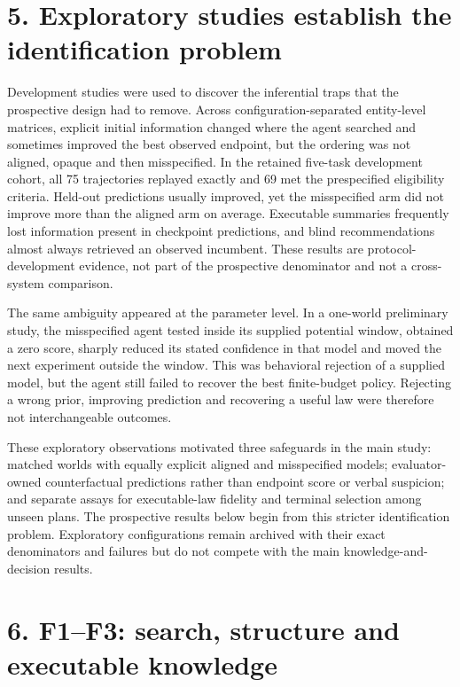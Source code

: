\documentclass[10pt,twocolumn]{article}
\begin{document}
\section{5. Exploratory studies establish the identification
problem}\label{exploratory-studies-establish-the-identification-problem}

Development studies were used to discover the inferential traps that the
prospective design had to remove. Across configuration-separated
entity-level matrices, explicit initial information changed where the
agent searched and sometimes improved the best observed endpoint, but
the ordering was not aligned, opaque and then misspecified. In the
retained five-task development cohort, all 75 trajectories replayed
exactly and 69 met the prespecified eligibility criteria. Held-out
predictions usually improved, yet the misspecified arm did not improve
more than the aligned arm on average. Executable summaries frequently
lost information present in checkpoint predictions, and blind
recommendations almost always retrieved an observed incumbent. These
results are protocol-development evidence, not part of the prospective
denominator and not a cross-system comparison.

The same ambiguity appeared at the parameter level. In a one-world
preliminary study, the misspecified agent tested inside its supplied
potential window, obtained a zero score, sharply reduced its stated
confidence in that model and moved the next experiment outside the
window. This was behavioral rejection of a supplied model, but the agent
still failed to recover the best finite-budget policy. Rejecting a wrong
prior, improving prediction and recovering a useful law were therefore
not interchangeable outcomes.

These exploratory observations motivated three safeguards in the main
study: matched worlds with equally explicit aligned and misspecified
models; evaluator-owned counterfactual predictions rather than endpoint
score or verbal suspicion; and separate assays for executable-law
fidelity and terminal selection among unseen plans. The prospective
results below begin from this stricter identification problem.
Exploratory configurations remain archived with their exact denominators
and failures but do not compete with the main knowledge-and-decision
results.

\section{6. F1--F3: search, structure and executable
knowledge}\label{f1f3-search-structure-and-executable-knowledge}
\end{document}
